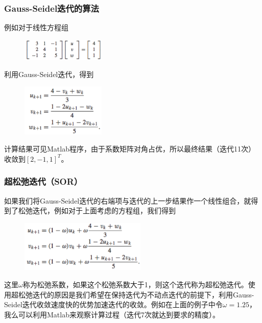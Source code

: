 \documentclass[10pt]{beamer}
\begin{document}
\begin{frame}
\frametitle{Gauss-Seidel迭代的算法}
例如对于线性方程组
\begin{figure}
\includegraphics[width=4cm]{figs/2_5_GS-2} 
\end{figure}
利用Gauss-Seidel迭代，得到
\begin{figure}
\includegraphics[width=4cm]{figs/2_5_GS-3} 
\end{figure}
计算结果可见Matlab程序，由于系数矩阵对角占优，所以最终结果（迭代11次）收敛到$[2,-1,1]^T$。
\end{frame}


\begin{frame}
\frametitle{超松弛迭代（SOR）}
如果我们将Gauss-Seidel迭代的右端项与迭代的上一步结果作一个线性组合，就得到了松弛迭代，例如对于上面考虑的方程组，我们得到
\begin{figure}
\includegraphics[width=6cm]{figs/2_5_SOR-1} 
\end{figure}
这里$\omega$称为松弛系数，如果这个松弛系数大于1，则这个迭代称为超松弛迭代。使用超松弛迭代的原因是我们希望在保持迭代为不动点迭代的前提下，利用Gauss-Seidel迭代收敛速度快的优势加速迭代的收敛。例如在上面的例子中令$\omega = 1.25$，我么可以利用Matlab来观察计算过程（迭代7次就达到要求的精度）。
\end{frame}
\end{document}
